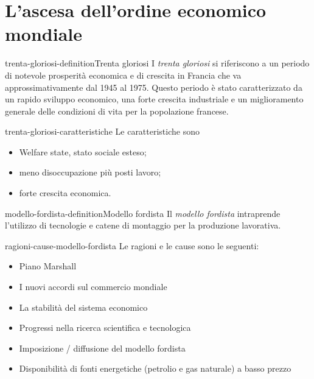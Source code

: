 \documentclass[preview]{standalone}
\begin{document}
\genpage

\section{L'ascesa dell'ordine economico mondiale}

\begin{snippetdefinition}{trenta-gloriosi-definition}{Trenta gloriosi}
    I \textit{trenta gloriosi} si riferiscono a un periodo di notevole prosperità economica e di crescita in Francia
    che va approssimativamente dal 1945 al 1975. Questo periodo è stato caratterizzato da un rapido
    sviluppo economico, una forte crescita industriale e un miglioramento generale delle condizioni di
    vita per la popolazione francese.
\end{snippetdefinition}

\begin{snippet}{trenta-gloriosi-caratteristiche}
    Le caratteristiche sono
    \begin{itemize}
        \item Welfare state, stato sociale esteso;
        \item meno disoccupazione più posti lavoro;
        \item forte crescita economica.
    \end{itemize}
\end{snippet}

\begin{snippetdefinition}{modello-fordista-definition}{Modello fordista}
    Il \textit{modello fordista} intraprende l'utilizzo di tecnologie e catene di montaggio
    per la produzione lavorativa.
\end{snippetdefinition}

\begin{snippet}{ragioni-cause-modello-fordista}
    Le ragioni e le cause sono le seguenti:
    \begin{itemize}
        \item Piano Marshall
        \item I nuovi accordi sul commercio mondiale
        \item La stabilità del sistema economico
        \item Progressi nella ricerca scientifica e tecnologica
        \item Imposizione / diffusione del modello fordista
        \item Disponibilità di fonti energetiche (petrolio e gas naturale) a basso prezzo
    \end{itemize}
\end{snippet}
\end{document}
